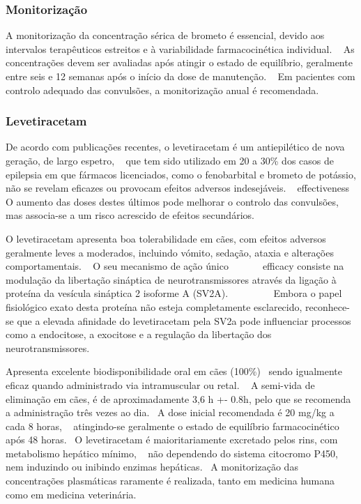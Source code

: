 \subsubsection{Monitorização}


A monitorização da concentração sérica de brometo é essencial, devido aos intervalos terapêuticos estreitos e à variabilidade farmacocinética individual. ~\cite{Gouveia2024} As concentrações devem ser avaliadas após atingir o estado de equilíbrio, geralmente entre seis e 12 semanas após o início da dose de manutenção. ~\cite{Gouveia2024} Em pacientes com controlo adequado das convulsões, a monitorização anual é recomendada.~\cite{Gouveia2024}


\subsubsection{Levetiracetam}


De acordo com publicações recentes, o levetiracetam é um antiepilético de nova geração, de largo espetro, ~\cite{Volk2008} que tem sido utilizado em 20 a 30\% dos casos de epilepsia em que fármacos licenciados, como o fenobarbital e brometo de potássio, não se revelam eficazes ou provocam efeitos adversos indesejáveis. ~\cite{Erath2020} effectiveness~\cite{ajvr} O aumento das doses destes últimos pode melhorar o controlo das convulsões, mas associa-se a um risco acrescido de efeitos secundários.~\cite{Volk2008}


O levetiracetam apresenta boa tolerabilidade em cães, com efeitos adversos geralmente leves a moderados, incluindo vómito, sedação, ataxia e alterações comportamentais. ~\cite{Erath2020} O seu mecanismo de ação único ~\cite{ajvr}~\cite{Contreras-Garcia2022}~\cite{Deshpande2014}~\cite{Kelly2017} ~\cite{CeldranDeCastro2023} efficacy consiste na modulação da libertação sináptica de neurotransmissores através da ligação à proteína da vesícula sináptica 2 isoforme A (SV2A). ~\cite{CeldranDeCastro2023} ~\cite{Volk2008} ~\cite{Contreras-Garcia2022} ~\cite{Kelly2017}~\cite{Packer2015}~\cite{Linder2024} Embora o papel fisiológico exato desta proteína não esteja completamente esclarecido, reconhece-se que a elevada afinidade do levetiracetam  pela SV2a pode influenciar processos como a endocitose, a exocitose e a regulação da libertação dos neurotransmissores.~\cite{Volk2008}


Apresenta excelente biodisponibilidade oral em cães (100\%)~\cite{Volk2008} sendo igualmente eficaz quando administrado via intramuscular ou retal. ~\cite{Kelly2017} A semi-vida de eliminação em cães, é de aproximadamente 3,6 h +- 0.8h, pelo que se recomenda a administração três vezes ao dia.~\cite{Volk2008} A dose inicial recomendada é 20 mg/kg a cada 8 horas, ~\cite{Linder2024} atingindo-se geralmente o estado de equilíbrio farmacocinético após 48 horas.~\cite{Volk2008}
O levetiracetam é maioritariamente excretado pelos rins, com metabolismo hepático mínimo, ~\cite{Kelly2017} não dependendo do sistema citocromo P450, nem induzindo ou inibindo enzimas hepáticas.~\cite{Volk2008} A monitorização das concentrações plasmáticas raramente é realizada, tanto em medicina humana~\cite{Volk2008} como em medicina veterinária.


